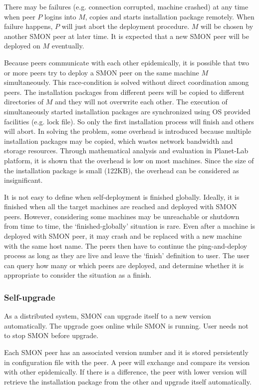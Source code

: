 There may be failures (e.g. connection corrupted, machine
crashed) at any time when peer $P$ logins
into $M$, copies and starts installation package remotely.
When failure happens, $P$ will just abort the deployment
procedure. $M$ will be chosen by another SMON peer at later
time. It is expected that a new SMON peer will be deployed
on $M$ eventually.

Because peers communicate with each other epidemically, it
is possible that two or more peers try to deploy a SMON peer
on the same machine $M$ simultaneously. This race-condition
is solved without direct coordination among peers. The
installation packages from different peers will be copied to
different directories of $M$ and they will not overwrite
each other. The execution of simultaneously started
installation packages are synchronized using OS provided
facilities (e.g. lock file). So only the first installation
process will finish and others will abort. In solving the
problem, some overhead is introduced because multiple
installation packages may be copied, which wastes network
bandwidth and storage resources. Through mathematical
analysis and evaluation in Planet-Lab platform, it
is shown that the overhead is low on most machines. Since
the size of the installation package is small (122KB), the
overhead can be considered as insignificant.

It is not easy to define when self-deployment is finished
globally. Ideally, it is finished when all the target
machines are reached and deployed with SMON peers.  However,
considering some machines may be unreachable or shutdown
from time to time, the `finished-globally' situation is
rare. Even after a machine is deployed with SMON peer, it
may crash and be replaced with a new machine with the same
host name. The peers then have to continue the
ping-and-deploy process as long as they are live and leave
the `finish' definition to user. The user can query how many
or which peers are deployed, and determine whether it is
appropriate to consider the situation as a finish.

\subsubsection*{Self-upgrade}

As a distributed system, SMON can upgrade itself to a new
version automatically. The upgrade goes online while SMON is
running. User needs not to stop SMON before upgrade.

Each SMON peer has an associated version number and it is
stored persistently in configuration file with the peer.  A
peer will exchange and compare its version with other epidemically. If
there is a difference, the peer with lower version will
retrieve the installation package from the other and upgrade
itself automatically.

